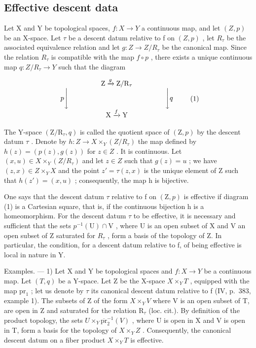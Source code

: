 \subsection{Effective descent data}

Let X and Y be topological spaces, \(f: X \to Y\) a continuous map, and let \((Z, p)\) be an X-space. Let \(\tau\) be a descent datum relative to f on \((Z, p)\) , let \(R_{\tau}\) be the associated equivalence relation and let \(g: Z \to Z/R_{\tau}\) be the canonical map. Since the relation \(R_{\tau}\) is compatible with the map \(f \circ p\) , there exists a unique continuous map \(q: Z/R_{\tau} \to Y\) such that the diagram

\[
\begin{array}{c} \mathrm{Z} \xrightarrow {g} \mathrm{Z} / \mathrm{R} _ {\tau} \\ p \Biggl \downarrow \qquad \qquad \qquad \qquad \qquad \qquad \qquad \Biggl \downarrow q \\ \mathrm{X} \xrightarrow {f} \mathrm{Y} \end{array}\tag{1}
\]

The Y-space \((\mathrm{Z}/\mathrm{R}_{\tau}, q)\) is called the quotient space of \((\mathrm{Z}, p)\) by the descent datum \(\tau\) . Denote by \(h: Z \to X \times_{Y} (Z/R_{\tau})\) the map defined by \(h(z) = (p(z), g(z))\) for \(z \in Z\) . It is continuous. Let \((x, u) \in X \times_{Y} (Z/R_{\tau})\) and let \(z \in Z\) such that \(g(z) = u\) ; we have \((z, x) \in Z \times_{Y} X\) and the point \(z' = \tau(z, x)\) is the unique element of Z such that \(h(z') = (x, u)\) ; consequently, the map h is bijective.

One says that the descent datum \(\tau\) relative to f on \((\mathrm{Z},p)\) is effective if diagram (1) is a Cartesian square, that is, if the continuous bijection h is a homeomorphism. For the descent datum \(\tau\) to be effective, it is necessary and sufficient that the sets \(p^{-1}(\mathrm{U})\cap \mathrm{V}\) , where U is an open subset of X and V an open subset of Z saturated for \(R_{\tau}\) , form a basis of the topology of Z. In particular, the condition, for a descent datum relative to f, of being effective is local in nature in Y.

Examples. --- 1) Let X and Y be topological spaces and \(f\colon X\to Y\) be a continuous map. Let \((T,q)\) be a Y-space. Let Z be the X-space \(X\times_Y T\) , equipped with the map \(\mathrm{pr}_{1}\) ; let us denote by \(\tau\) its canonical descent datum relative to f (IV, p.~383, example 1). The subsets of Z of the form \(X\times_Y V\) where V is an open subset of T, are open in Z and saturated for the relation \(\mathrm{R}_{\tau}\) (loc. cit.). By definition of the product topology, the sets \(U\times_Y\overline{\mathrm{pr}}_{2}^{-1}(V)\) , where U is open in X and V is open in T, form a basis for the topology of \(X\times_Y Z\) . Consequently, the canonical descent datum on a fiber product \(X\times_Y T\) is effective.

